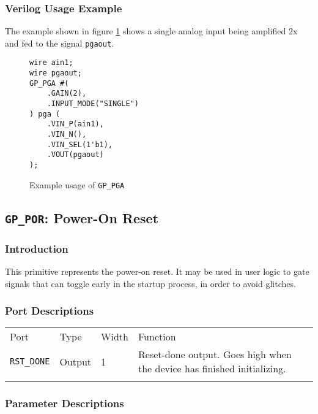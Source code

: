 \documentclass[11pt]{article}
\newcommand{\tokenstyle}[1]{\texttt{#1}}
\newcommand{\wirestyle}[1]{\texttt{#1}}
\newcommand{\whenstyle}[1]{{\fontseries{sb}\selectfont#1}}
\newcommand{\thinhline}{\Xhline{1\arrayrulewidth}}
\newcommand{\thickhline}{\Xhline{2.5\arrayrulewidth}}
\begin{document}
\subsubsection{Verilog Usage Example}

The example shown in figure \ref{gp-pga-example} shows a single analog input being amplified 2x and fed to the signal
\wirestyle{pgaout}.

\begin{figure}[h]
\begin{lstlisting}
wire ain1;
wire pgaout;
GP_PGA #(
	.GAIN(2),
	.INPUT_MODE("SINGLE")
) pga (
	.VIN_P(ain1),
	.VIN_N(),
	.VIN_SEL(1'b1),
	.VOUT(pgaout)
);
\end{lstlisting}
\caption{Example usage of \tokenstyle{GP\_PGA}}
\label{gp-pga-example}
\end{figure}


\pagebreak
\clearpage
\subsection{\tokenstyle{GP\_POR}: Power-On Reset}
\label{gp-por}

\subsubsection{Introduction}
This primitive represents the power-on reset. It may be used in user logic to gate signals that can toggle early in the
startup process, in order to avoid glitches.


\subsubsection{Port Descriptions}

\begin{tabularx}{\textwidth}{lllX}
\thinhline
\whenstyle{Port} & \whenstyle{Type} & \whenstyle{Width} & \whenstyle{Function} \\
\thickhline
\tokenstyle{RST\_DONE} & Output & 1 & Reset-done output. Goes high when the device has finished initializing.\\
\thinhline
\end{tabularx}

\subsubsection{Parameter Descriptions}
\end{document}
